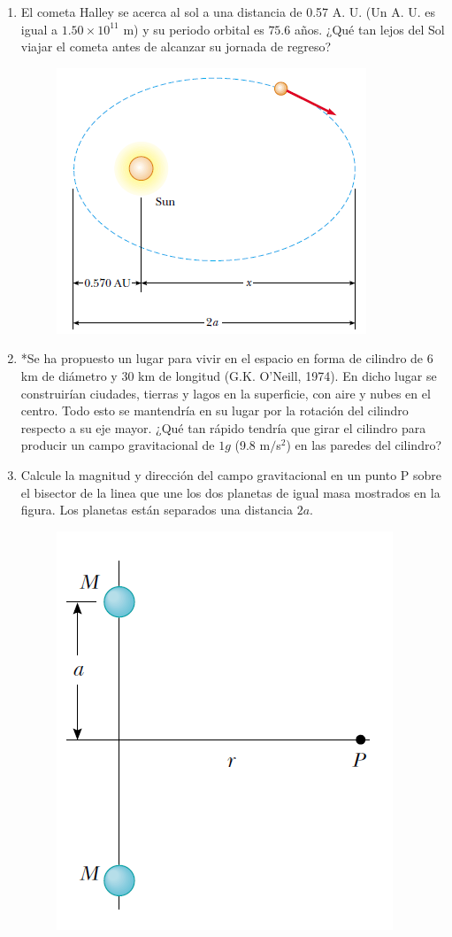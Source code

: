 \documentclass[11pt,twocolumn]{article}
\begin{document}
\begin{enumerate}
\item El cometa Halley se acerca al sol a una distancia de 0.57 A. U. (Un A. U. es igual a $1.50 \times 10^{11}$ m) y su periodo orbital es $75.6$ años. ¿Qué tan lejos del Sol viajar el cometa antes de alcanzar su jornada de regreso?
\begin{figure}[h]
\centering
\includegraphics[scale=0.5]{fig2}
\end{figure}

\item *Se ha propuesto un lugar para vivir en el espacio en forma de cilindro de $6$ km de diámetro y $30$ km de longitud (G.K. O'Neill, 1974). En dicho lugar se construirían ciudades, tierras y lagos en la superficie, con aire y nubes en el centro. Todo esto se mantendría en su lugar por la rotación del cilindro respecto a su eje mayor. ¿Qué tan rápido tendría que girar el cilindro para producir un campo gravitacional de $1 g$ (9.8 m$/$s$^{2}$) en las paredes del cilindro?


\item Calcule la magnitud y dirección del campo gravitacional en un punto P sobre el bisector de la linea que une los dos planetas de igual masa mostrados en la figura. Los planetas están separados una distancia $2a$.
\begin{figure}[h]
\centering
\includegraphics[scale=0.4]{fig6}
\end{figure}


\end{enumerate}
\end{document}
